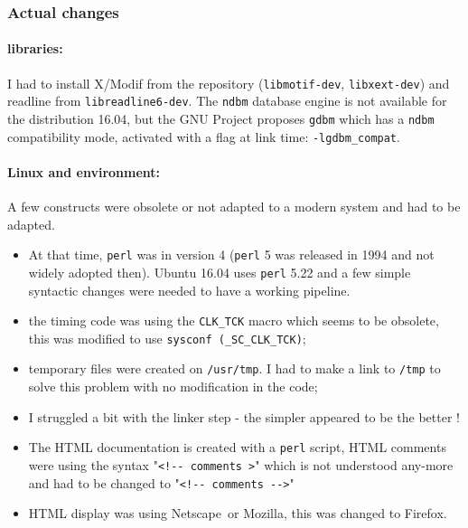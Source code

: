 \hypertarget{actual-changes}{%
\subsubsection{Actual changes}\label{actual-changes}}

\paragraph{libraries:} I had to install X/Modif from the repository
(\texttt{libmotif-dev}, \texttt{libxext-dev}) and readline from
\texttt{libreadline6-dev}. The \texttt{ndbm} database engine is not
available for the distribution 16.04, but the GNU Project proposes \texttt{gdbm} which has a
\texttt{ndbm} compatibility mode, activated with a flag at link time:
\texttt{-lgdbm\_compat}.

\paragraph{Linux and environment:} A few constructs were obsolete or not
adapted to a modern system and had to be adapted.

\begin{itemize}
\tightlist
\item
  At that time, \texttt{perl} was in version 4 (\texttt{perl} 5 was
  released in 1994 and not widely adopted then). Ubuntu 16.04
  uses \texttt{perl} 5.22 and a few simple syntactic changes were
  needed to have a working pipeline.
\item
  the timing code was using the \texttt{CLK\_TCK} macro which seems to
  be obsolete, this was modified to use
  \texttt{sysconf\ (\_SC\_CLK\_TCK)};
\item
  temporary files were created on \texttt{/usr/tmp}. I had to make a
  link to \texttt{/tmp} to solve this problem with no modification in
  the code;
\item
  I struggled a bit with the linker step - the simpler appeared to be
  the better !
\item
  The HTML documentation is created with a \texttt{perl} script, HTML
  comments were using the syntax
  "\texttt{\textless{}!-\/-\ comments\ \textgreater{}}" which is not
  understood any-more and had to be changed to
  "\texttt{\textless{}!-\/-\ comments\ -\/-\textgreater{}}"
\item
  HTML display was using Netscape\texttrademark\ or Mozilla\texttrademark, this was changed to
  Firefox\texttrademark . 
\end{itemize}

